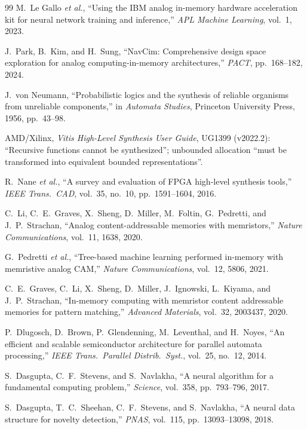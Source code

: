 \documentclass[11pt]{article}
\begin{document}
\begin{thebibliography}{99}
 M.~Le Gallo \textit{et al.}, ``Using the IBM analog in-memory hardware acceleration kit for neural network training and inference,'' \textit{APL Machine Learning}, vol.~1, 2023.

 J.~Park, B.~Kim, and H.~Sung, ``NavCim: Comprehensive design space exploration for analog computing-in-memory architectures,'' \textit{PACT}, pp.~168--182, 2024.

 J.~von Neumann, ``Probabilistic logics and the synthesis of reliable organisms from unreliable components,'' in \textit{Automata Studies}, Princeton University Press, 1956, pp.~43--98.

 AMD/Xilinx, \textit{Vitis High-Level Synthesis User Guide}, UG1399 (v2022.2): ``Recursive functions cannot be synthesized''; unbounded allocation ``must be transformed into equivalent bounded representations''.

 R.~Nane \textit{et al.}, ``A survey and evaluation of FPGA high-level synthesis tools,'' \textit{IEEE Trans.\ CAD}, vol.~35, no.~10, pp.~1591--1604, 2016.

 C.~Li, C.~E.~Graves, X.~Sheng, D.~Miller, M.~Foltin, G.~Pedretti, and J.~P.~Strachan, ``Analog content-addressable memories with memristors,'' \textit{Nature Communications}, vol.~11, 1638, 2020.

 G.~Pedretti \textit{et al.}, ``Tree-based machine learning performed in-memory with memristive analog CAM,'' \textit{Nature Communications}, vol.~12, 5806, 2021.

 C.~E.~Graves, C.~Li, X.~Sheng, D.~Miller, J.~Ignowski, L.~Kiyama, and J.~P.~Strachan, ``In-memory computing with memristor content addressable memories for pattern matching,'' \textit{Advanced Materials}, vol.~32, 2003437, 2020.

 P.~Dlugosch, D.~Brown, P.~Glendenning, M.~Leventhal, and H.~Noyes, ``An efficient and scalable semiconductor architecture for parallel automata processing,'' \textit{IEEE Trans.\ Parallel Distrib.\ Syst.}, vol.~25, no.~12, 2014.

 S.~Dasgupta, C.~F.~Stevens, and S.~Navlakha, ``A neural algorithm for a fundamental computing problem,'' \textit{Science}, vol.~358, pp.~793--796, 2017.

 S.~Dasgupta, T.~C.~Sheehan, C.~F.~Stevens, and S.~Navlakha, ``A neural data structure for novelty detection,'' \textit{PNAS}, vol.~115, pp.~13093--13098, 2018.


\end{thebibliography}
\end{document}
